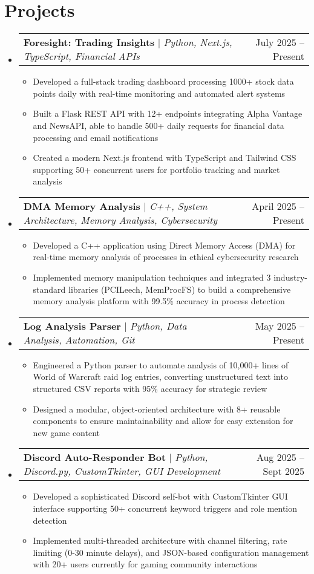 \documentclass[letterpaper,11pt]{article}
\makeatletter
\newcommand{\resumeItem}[1]{
  \item\small{
    {#1 \vspace{-2pt}}
  }
}
\newcommand{\resumeProjectHeading}[2]{
    \item
    \begin{tabular*}{0.97\textwidth}{l@{\extracolsep{\fill}}r}
      \small#1 & #2 \\
    \end{tabular*}\vspace{-7pt}
}
\newcommand{\resumeSubHeadingListStart}{\begin{itemize}[leftmargin=0.15in, label={}]}
\newcommand{\resumeSubHeadingListEnd}{\end{itemize}}
\newcommand{\resumeItemListStart}{\begin{itemize}}
\newcommand{\resumeItemListEnd}{\end{itemize}\vspace{-5pt}}
\makeatother
\begin{document}
\section{Projects}
    \resumeSubHeadingListStart
    \resumeProjectHeading
    {\textbf{Foresight: Trading Insights} $|$ \emph{Python, Next.js, TypeScript, Financial APIs}}{July 2025 -- Present}
    \resumeItemListStart
        \resumeItem{Developed a full-stack trading dashboard processing 1000+ stock data points daily with real-time monitoring and automated alert systems}
        \resumeItem{Built a Flask REST API with 12+ endpoints integrating Alpha Vantage and NewsAPI, able to handle 500+ daily requests for financial data processing and email notifications}
        \resumeItem{Created a modern Next.js frontend with TypeScript and Tailwind CSS supporting 50+ concurrent users for portfolio tracking and market analysis}
    \resumeItemListEnd
      \resumeProjectHeading
          {\textbf{DMA Memory Analysis} $|$ \emph{C++, System Architecture, Memory Analysis, Cybersecurity}}{April 2025 -- Present}
          \resumeItemListStart
            \resumeItem{Developed a C++ application using Direct Memory Access (DMA) for real-time memory analysis of processes in ethical cybersecurity research}
            \resumeItem{Implemented memory manipulation techniques and integrated 3 industry-standard libraries (PCILeech, MemProcFS) to build a comprehensive memory analysis platform with 99.5\% accuracy in process detection}
          \resumeItemListEnd
      \resumeProjectHeading
          {\textbf{Log Analysis Parser} $|$ \emph{Python, Data Analysis, Automation, Git}}{May 2025 -- Present}
          \resumeItemListStart
            \resumeItem{Engineered a Python parser to automate analysis of 10,000+ lines of World of Warcraft raid log entries, converting unstructured text into structured CSV reports with 95\% accuracy for strategic review}
            \resumeItem{Designed a modular, object-oriented architecture with 8+ reusable components to ensure maintainability and allow for easy extension for new game content}
          \resumeItemListEnd
      \resumeProjectHeading
          {\textbf{Discord Auto-Responder Bot} $|$ \emph{Python, Discord.py, CustomTkinter, GUI Development}}{Aug 2025 -- Sept 2025}
          \resumeItemListStart
            \resumeItem{Developed a sophisticated Discord self-bot with CustomTkinter GUI interface supporting 50+ concurrent keyword triggers and role mention detection}
            \resumeItem{Implemented multi-threaded architecture with channel filtering, rate limiting (0-30 minute delays), and JSON-based configuration management with 20+ users currently for gaming community interactions}
          \resumeItemListEnd
    \resumeSubHeadingListEnd
\end{document}
